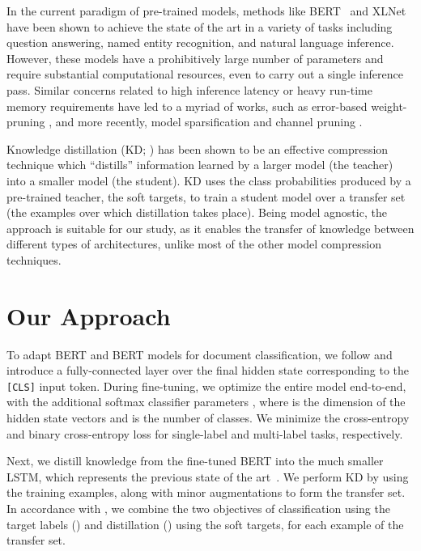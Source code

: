 \documentclass[11pt,a4paper]{article}
\newcommand{\BLSTMR}[1]{LSTM}
\newcommand{\BERTL}[1]{BERT}
\newcommand{\BERTB}[1]{BERT}
\begin{document}
In the current paradigm of pre-trained models, methods like BERT~\cite{devlin2018bert} and XLNet~\cite{Yang2019XLNetGA} have been shown to achieve the state of the art in a variety of tasks including question answering, named entity recognition, and natural language inference.
However, these models have a prohibitively large number of parameters and require substantial computational resources, even to carry out a single inference pass.
Similar concerns related to high inference latency or heavy run-time memory requirements have led to a myriad of works, such as error-based weight-pruning \cite{lecunprune}, and more recently, model sparsification and channel pruning \cite{loprune, netslim}.

Knowledge distillation (KD; \citealp{bakd, hintonkd}) has been shown to be an effective compression technique which ``distills'' information learned by a larger model (the teacher) into a smaller model (the student).
KD uses the class probabilities produced by a pre-trained teacher, the soft targets, to train a student model over a transfer set (the examples over which distillation takes place).
Being model agnostic, the approach is suitable for our study, as it enables the transfer of knowledge between different types of architectures, unlike most of the other model compression techniques.

\section{Our Approach}

To adapt \BERTB{} and \BERTL{} models for document classification, we follow \citet{devlin2018bert} and introduce a fully-connected layer over the final hidden state corresponding to the \texttt{[CLS]} input token.
During fine-tuning, we optimize the entire model end-to-end, with the additional softmax classifier parameters , where  is the dimension of the hidden state vectors and  is the number of classes.
We minimize the cross-entropy and binary cross-entropy loss for single-label and multi-label tasks, respectively.

Next, we distill knowledge from the fine-tuned \BERTL{} into the much smaller \BLSTMR{}, which represents the previous state of the art~\cite{adhikari2019rethinking}.
We perform KD by using the training examples, along with minor augmentations to form the transfer set.
In accordance with \citet{hintonkd}, we combine the two objectives of classification using the target labels () and distillation () using the soft targets, for each example of the transfer set.
\end{document}
